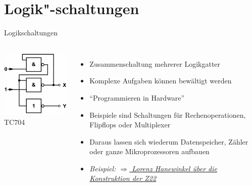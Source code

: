 \section{Logik"-schaltungen}
\begin{frame}{Logikschaltungen}
  \begin{columns}
    \includegraphics[width=\textwidth,height=.8\textheight,keepaspectratio]{a14/tc704.png}\\
    {\tiny TC704 \hyperlink{refs}{\cite{bna}}}
    \begin{itemize}
      \item Zusammenschaltung mehrerer Logikgatter
      \item Komplexe Aufgaben können bewältigt werden
      \item ``Programmieren in Hardware''
      \item Beispiele sind Schaltungen für Rechenoperationen, Flipflops oder Multiplexer
      \item Daraus lassen sich wiederum Datenspeicher, Zähler oder ganze Mikroprozessoren aufbauen
      \item \emph{Beispiel: \href{https://media.ccc.de/v/gpn14_-_5862_-__-_medientheater_-_201406211600_-_zuse_z22_-_lorenz_hanewinkel}{$\Rightarrow$ Lorenz Hanewinkel über die Konstruktion der Z22}}
    \end{itemize}
  \end{columns}
\end{frame}

